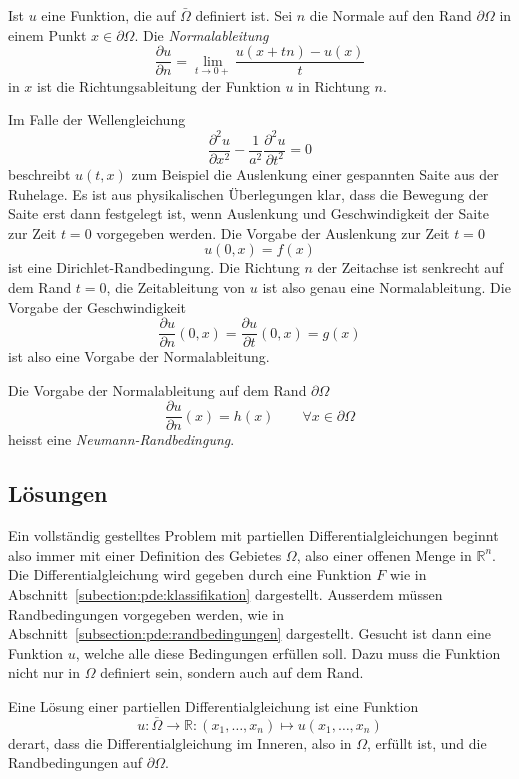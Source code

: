\begin{definition}
Ist $u$ eine Funktion, die auf $\bar\Omega$ definiert ist.
Sei $n$ die Normale auf den Rand $\partial\Omega$ in einem Punkt
$x\in\partial\Omega$.
Die {\em Normalableitung}
\[
\frac{\partial u}{\partial n}
=
\lim_{t\to 0+} \frac{u(x+tn)-u(x)}{t}
\]
in $x$ ist die Richtungsableitung 
der Funktion $u$ in Richtung $n$.
\end{definition}

Im Falle der Wellengleichung
\[
\frac{\partial^2 u}{\partial x^2}
-
\frac{1}{a^2}
\frac{\partial^2 u}{\partial t^2}
=0
\]
beschreibt $u(t,x)$ zum Beispiel die Auslenkung einer gespannten Saite
aus der Ruhelage.
Es ist aus physikalischen Überlegungen klar, dass die Bewegung der Saite
erst dann festgelegt ist, wenn Auslenkung und Geschwindigkeit der Saite
zur Zeit $t=0$ vorgegeben werden.
Die Vorgabe der Auslenkung zur Zeit $t=0$
\[
u(0,x) = f(x)
\]
ist eine Dirichlet-Randbedingung.
Die Richtung $n$ der Zeitachse ist senkrecht auf dem Rand $t=0$,
die Zeitableitung von $u$ ist also genau eine Normalableitung.
Die Vorgabe der Geschwindigkeit
\[
\frac{\partial u}{\partial n}(0,x)
=
\frac{\partial u}{\partial t}(0,x)
=
g(x)
\]
ist also eine Vorgabe der Normalableitung.

\begin{definition}
Die Vorgabe der Normalableitung auf dem Rand $\partial\Omega$
\[
\frac{\partial u}{\partial n}(x) = h(x)\qquad \forall x\in\partial\Omega
\]
heisst eine {\em Neumann-Randbedingung}.
\end{definition}

\subsection{Lösungen
\label{subsection:pde:loesungen}}
Ein vollständig gestelltes Problem mit partiellen Differentialgleichungen
beginnt also immer mit einer Definition des Gebietes $\Omega$, also
einer offenen Menge in $\mathbb R^n$.
Die Differentialgleichung wird gegeben durch eine Funktion $F$ wie in
Abschnitt~\ref{subection:pde:klassifikation} dargestellt.
Ausserdem müssen Randbedingungen vorgegeben werden, wie in
Abschnitt~\ref{subsection:pde:randbedingungen} dargestellt.
Gesucht ist dann eine Funktion $u$, welche alle diese Bedingungen
erfüllen soll.
Dazu muss die Funktion nicht nur in $\Omega$ definiert sein, 
sondern auch auf dem Rand.

\begin{definition}
Eine Lösung einer partiellen Differentialgleichung ist eine Funktion
\[
u\colon \bar{\Omega} \to \mathbb R:(x_1,\dots,x_n)\mapsto u(x_1,\dots,x_n)
\]
derart, dass die Differentialgleichung im Inneren, also in $\Omega$,
erfüllt ist, und die Randbedingungen auf $\partial\Omega$.
\end{definition}






